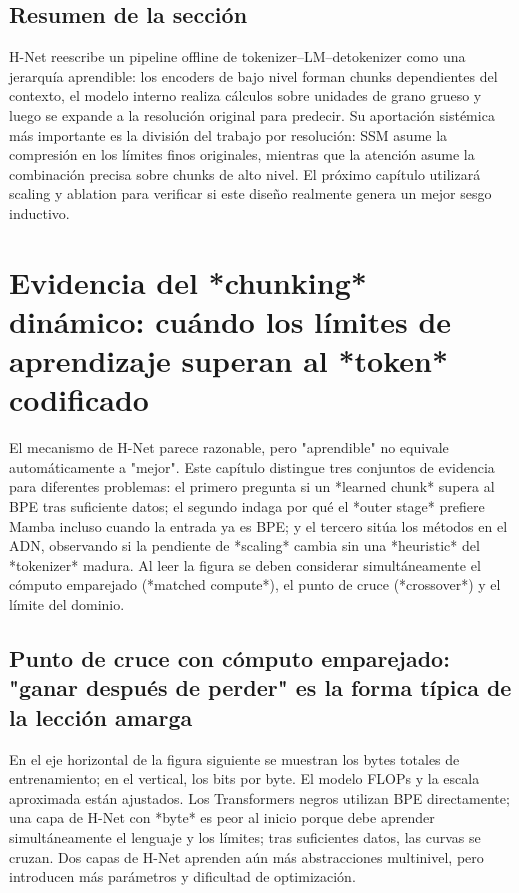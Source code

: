 \documentclass[a4paper]{article}
\begin{document}
\subsection{Resumen de la sección}

H-Net reescribe un pipeline offline de tokenizer--LM--detokenizer como una jerarquía aprendible: los encoders de bajo nivel forman chunks dependientes del contexto, el modelo interno realiza cálculos sobre unidades de grano grueso y luego se expande a la resolución original para predecir. Su aportación sistémica más importante es la división del trabajo por resolución: SSM asume la compresión en los límites finos originales, mientras que la atención asume la combinación precisa sobre chunks de alto nivel. El próximo capítulo utilizará scaling y ablation para verificar si este diseño realmente genera un mejor sesgo inductivo.


\section{Evidencia del *chunking* dinámico: cuándo los límites de aprendizaje superan al *token* codificado}

El mecanismo de H-Net parece razonable, pero "aprendible" no equivale automáticamente a "mejor". Este capítulo distingue tres conjuntos de evidencia para diferentes problemas: el primero pregunta si un *learned chunk* supera al BPE tras suficiente datos; el segundo indaga por qué el *outer stage* prefiere Mamba incluso cuando la entrada ya es BPE; y el tercero sitúa los métodos en el ADN, observando si la pendiente de *scaling* cambia sin una *heuristic* del *tokenizer* madura. Al leer la figura se deben considerar simultáneamente el cómputo emparejado (*matched compute*), el punto de cruce (*crossover*) y el límite del dominio.

\subsection{Punto de cruce con cómputo emparejado: "ganar después de perder" es la forma típica de la lección amarga}

En el eje horizontal de la figura siguiente se muestran los bytes totales de entrenamiento; en el vertical, los bits por byte. El modelo FLOPs y la escala aproximada están ajustados. Los Transformers negros utilizan BPE directamente; una capa de H-Net con *byte* es peor al inicio porque debe aprender simultáneamente el lenguaje y los límites; tras suficientes datos, las curvas se cruzan. Dos capas de H-Net aprenden aún más abstracciones multinivel, pero introducen más parámetros y dificultad de optimización.
\end{document}
